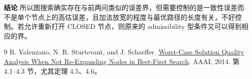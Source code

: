 \documentclass[utf8]{ctexart}
\theoremstyle{mystyle}
\begin{document}
\medskip
\noindent\textbf{结论}
所以图搜索确实存在与前两问类似的误差界，但需要控制的是一致性误差而不是单个节点上的高估误差，且加法放宽的程度与最优路径的长度有关，不好控制。若允许重新打开 CLOSED 节点，则原来的 admissibility 型条件又可以得到相应的界。

\begingroup
\small
\begin{thebibliography}{9}
R. Valenzano, N. R. Sturtevant, and J. Schaeffer.
\href{https://www.cs.du.edu/~sturtevant/papers/non_reopening.pdf}
{Worst-Case Solution Quality Analysis When Not Re-Expanding Nodes in Best-First Search}.
AAAI, 2014. 第 4.1--4.3 节，尤其定理 4.5、4.6。
\end{thebibliography}
\endgroup

\end{document}

